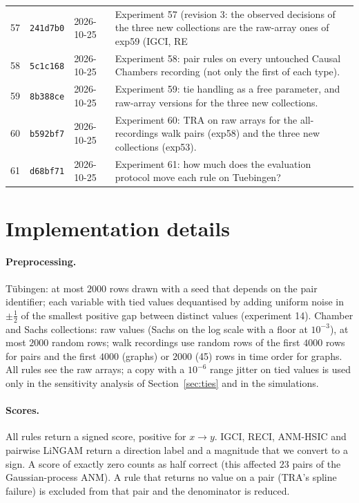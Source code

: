 \begin{longtable}{@{}rllp{9.8cm}@{}}
57 & \texttt{241d7b0} & 2026-10-25 & Experiment 57 (revision 3: the observed decisions of the three new collections are the raw-array ones of exp59 (IGCI, RE\\
58 & \texttt{5c1c168} & 2026-10-25 & Experiment 58: pair rules on every untouched Causal Chambers recording (not only the first of each type).\\
59 & \texttt{8b388ce} & 2026-10-25 & Experiment 59: tie handling as a free parameter, and raw-array versions for the three new collections.\\
60 & \texttt{b592bf7} & 2026-10-25 & Experiment 60: TRA on raw arrays for the all-recordings walk pairs (exp58) and the three new collections (exp53).\\
61 & \texttt{d68bf71} & 2026-10-25 & Experiment 61: how much does the evaluation protocol move each rule on Tuebingen?\\
\bottomrule
\end{longtable}
\endgroup

\section{Implementation details}\label{app:impl}
\paragraph{Preprocessing.} T\"ubingen: at most $2000$ rows drawn with a seed that depends on the pair identifier; each variable with tied values dequantised by adding uniform noise in $\pm\frac12$ of the smallest positive gap between distinct values (experiment 14). Chamber and Sachs collections: raw values (Sachs on the log scale with a floor at $10^{-3}$), at most $2000$ random rows; walk recordings use random rows of the first $4000$ rows for pairs and the first $4000$ (graphs) or $2000$ (45) rows in time order for graphs. All rules see the raw arrays; a copy with a $10^{-6}$ range jitter on tied values is used only in the sensitivity analysis of Section~\ref{sec:ties} and in the simulations.
\paragraph{Scores.} All rules return a signed score, positive for $x\to y$. IGCI, RECI, ANM-HSIC and pairwise LiNGAM return a direction label and a magnitude that we convert to a sign. A score of exactly zero counts as half correct (this affected $23$ pairs of the Gaussian-process ANM). A rule that returns no value on a pair (TRA's spline failure) is excluded from that pair and the denominator is reduced.
